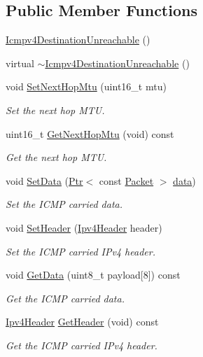 \subsection*{Public Member Functions}
\begin{DoxyCompactItemize}
\item 
\hyperlink{classns3_1_1Icmpv4DestinationUnreachable_ae9b0b915f289ba0f9ed17c326647c5e2}{Icmpv4\+Destination\+Unreachable} ()
\item 
virtual \hyperlink{classns3_1_1Icmpv4DestinationUnreachable_a4a5153612da829907258e2374b3e7ff5}{$\sim$\+Icmpv4\+Destination\+Unreachable} ()
\item 
void \hyperlink{classns3_1_1Icmpv4DestinationUnreachable_a673a9de9f51498a1e23c3972654668cf}{Set\+Next\+Hop\+Mtu} (uint16\+\_\+t mtu)
\begin{DoxyCompactList}\small\item\em Set the next hop M\+TU. \end{DoxyCompactList}\item 
uint16\+\_\+t \hyperlink{classns3_1_1Icmpv4DestinationUnreachable_a22bb66fae51b5c2fe442c23783e3a57c}{Get\+Next\+Hop\+Mtu} (void) const 
\begin{DoxyCompactList}\small\item\em Get the next hop M\+TU. \end{DoxyCompactList}\item 
void \hyperlink{classns3_1_1Icmpv4DestinationUnreachable_aba3d3f5a490235934b6b70ca19793dcc}{Set\+Data} (\hyperlink{classns3_1_1Ptr}{Ptr}$<$ const \hyperlink{classns3_1_1Packet}{Packet} $>$ \hyperlink{topology-example-sim_8cc_a26c65296e316af77b787dc77469bb2a4}{data})
\begin{DoxyCompactList}\small\item\em Set the I\+C\+MP carried data. \end{DoxyCompactList}\item 
void \hyperlink{classns3_1_1Icmpv4DestinationUnreachable_a8e441092f77a8d1616731fe459fca7c4}{Set\+Header} (\hyperlink{classns3_1_1Ipv4Header}{Ipv4\+Header} header)
\begin{DoxyCompactList}\small\item\em Set the I\+C\+MP carried I\+Pv4 header. \end{DoxyCompactList}\item 
void \hyperlink{classns3_1_1Icmpv4DestinationUnreachable_ab105e0bf088db1d45495212b39525b56}{Get\+Data} (uint8\+\_\+t payload\mbox{[}8\mbox{]}) const 
\begin{DoxyCompactList}\small\item\em Get the I\+C\+MP carried data. \end{DoxyCompactList}\item 
\hyperlink{classns3_1_1Ipv4Header}{Ipv4\+Header} \hyperlink{classns3_1_1Icmpv4DestinationUnreachable_a85694c94143f9280fbf66caff7c3e320}{Get\+Header} (void) const 
\begin{DoxyCompactList}\small\item\em Get the I\+C\+MP carried I\+Pv4 header. \end{DoxyCompactList}\end{DoxyCompactItemize}

